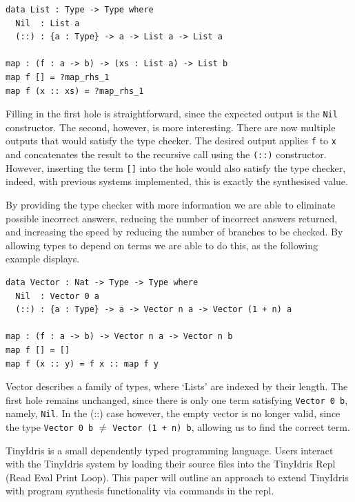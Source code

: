 \documentclass[a4paper]{article}
\begin{document}
\begin{center}
\begin{verbatim}
data List : Type -> Type where
  Nil  : List a
  (::) : {a : Type} -> a -> List a -> List a

map : (f : a -> b) -> (xs : List a) -> List b 
map f [] = ?map_rhs_1
map f (x :: xs) = ?map_rhs_1
\end{verbatim}
\end{center}

Filling in the first hole is straightforward, since the expected output 
is the \texttt{Nil} constructor. The second, however, is more interesting.
There are now multiple outputs that would satisfy the type checker. 
The desired output applies \texttt{f} to \texttt{x} and concatenates the result to the
recursive call using the \texttt{(::)} constructor. However, inserting the term
\texttt{[]} into the hole would also satisfy the type checker, indeed,
with previous systems implemented, this is exactly the synthesised 
value.

By providing the type checker with more information we are able to 
eliminate possible incorrect answers, reducing the number of incorrect 
answers returned, and increasing the speed by reducing the number of 
branches to be checked. By allowing types to depend on terms we are 
able to do this, as the following example displays.

\begin{center}
\begin{verbatim}
data Vector : Nat -> Type -> Type where
  Nil  : Vector 0 a
  (::) : {a : Type} -> a -> Vector n a -> Vector (1 + n) a

map : (f : a -> b) -> Vector n a -> Vector n b
map f [] = []
map f (x :: y) = f x :: map f y
\end{verbatim}
\end{center}

Vector describes a family of types, where `Lists' are indexed
by their length. The first hole remains unchanged, since there is 
only one term satisfying \texttt{Vector 0 b}, namely, \texttt{Nil}.
In the (::) case however, the empty vector is no longer valid,
since the type \texttt{Vector 0 b} \(\neq\) \texttt{Vector (1 + n) b},
allowing us to find the correct term. 

TinyIdris is a small dependently typed programming language.
Users interact with the TinyIdris system by loading their source files
into the TinyIdris Repl (Read Eval Print Loop). This paper will outline 
an approach to extend TinyIdris with program synthesis functionality via
commands in the repl.
\end{document}
